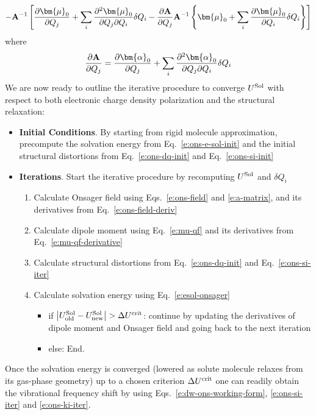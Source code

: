 \documentclass[b5paper,oneside,fleqn,11pt]{book}
\newcommand{\BM}[1]{\bm{#1}}
\newcommand{\fderiv}[2]{\ensuremath{
    \frac{\partial #1}{\partial #2}}}
\newcommand{\sderivd}[3]{\ensuremath{
    \frac{\partial^2 #1}{\partial #2 \partial #3}
    }}
\begin{document}
\begin{refsection}
\begin{equation}
- {\bf A}^{-1} 
   \left[ 
       \fderiv{{\BM \mu}_0}{Q_j} 
      + \sum_i \sderivd{{\BM \mu}_0}{Q_j}{Q_i} \delta Q_i 
      - \fderiv{{\bf A}}{Q_j}  {\bf A}^{-1}  
           \left\{ 
               {\BM \mu}_0 + \sum_i \fderiv{{\BM \mu}_0}{Q_i}\delta Q_i
           \right\}
   \right]
\end{equation}
%
where
%
\begin{equation}
  \fderiv{{\bf A}}{Q_j} = \fderiv{{\BM \alpha}_0}{Q_j} 
               + \sum_i \sderivd{{\BM \alpha}_0}{Q_j}{Q_i} \delta Q_i
\end{equation}
%
We are now ready to outline the iterative procedure
to converge $U^{\rm Sol}$ with respect to both electronic
charge density polarization and the structural
relaxation:
%
\begin{itemize}
\item[\textbullet] {\bf Initial Conditions}. 
                        By starting from rigid molecule approximation,
                        precompute the solvation energy from Eq.~\eqref{e:ons-e-sol-init}
                        and the initial structural distortions
                        from Eq.~\eqref{e:ons-dq-init} and 
                        Eq.~\eqref{e:ons-si-init}
\item[\textbullet] {\bf Iterations}. Start the iterative procedure 
                        by recomputing $U^{\rm Sol}$ and $\delta Q_i$
\begin{enumerate}
 \item Calculate Onsager field using Eqs.~\eqref{e:ons-field} and \eqref{e:a-matrix}, 
       and its derivatives from Eq.~\eqref{e:ons-field-deriv}
 \item Calculate dipole moment using Eq.~\eqref{e:mu-qf} 
       and its derivatives from Eq.~\eqref{e:mu-qf-derivative}
 \item Calculate structural distortions from Eq.~\eqref{e:ons-dq-init}
       and Eq.~\eqref{e:ons-si-iter}
 \item Calculate solvation energy using Eq.~\eqref{e:esol-onsager}
 \begin{itemize}
      \item if $\left| U^{\rm Sol}_{\rm old} - U^{\rm Sol}_{\rm new}\right| > \Delta U^{\rm crit}$:
            continue by updating the derivatives of dipole moment and Onsager field
            and going back to the next iteration
      \item else: End. 
 \end{itemize}    
\end{enumerate}
\end{itemize}
%
Once the solvation energy is converged 
(lowered as solute molecule
relaxes from its gas\hyp{}phase geometry) 
up to a chosen criterion $\Delta U^{\rm crit}$
one can readily obtain
the vibrational frequency shift by using Eqs.~\eqref{e:dw-ons-working-form},
\eqref{e:ons-si-iter} and \eqref{e:ons-ki-iter}.


\end{refsection}
\end{document}
